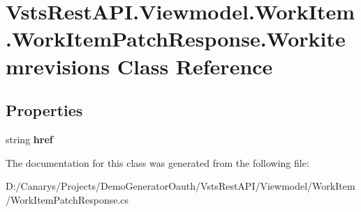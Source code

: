 \hypertarget{class_vsts_rest_a_p_i_1_1_viewmodel_1_1_work_item_1_1_work_item_patch_response_1_1_workitemrevisions}{}\section{Vsts\+Rest\+A\+P\+I.\+Viewmodel.\+Work\+Item.\+Work\+Item\+Patch\+Response.\+Workitemrevisions Class Reference}
\label{class_vsts_rest_a_p_i_1_1_viewmodel_1_1_work_item_1_1_work_item_patch_response_1_1_workitemrevisions}
\subsection*{Properties}
\begin{DoxyCompactItemize}
\item 
\mbox{\label{class_vsts_rest_a_p_i_1_1_viewmodel_1_1_work_item_1_1_work_item_patch_response_1_1_workitemrevisions_aad77bb209735e66e82345ec045f74a4a}} 
string {\bfseries href}
\end{DoxyCompactItemize}


The documentation for this class was generated from the following file\+:\begin{DoxyCompactItemize}
\item 
D\+:/\+Canarys/\+Projects/\+Demo\+Generator\+Oauth/\+Vsts\+Rest\+A\+P\+I/\+Viewmodel/\+Work\+Item/Work\+Item\+Patch\+Response.\+cs\end{DoxyCompactItemize}
